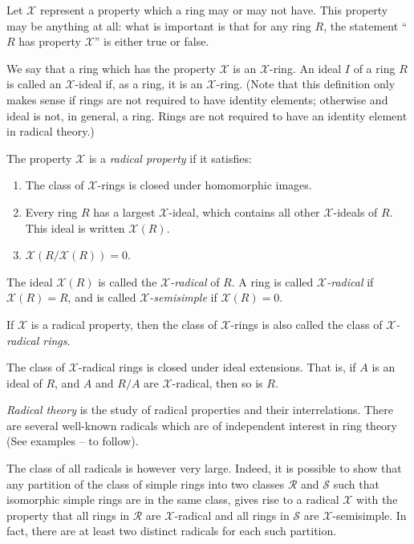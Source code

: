 \documentclass[12pt]{article}
\newcommand{\xrad}{\mathcal{X}}
\begin{document}

Let $\xrad$ represent a property which a ring may or may not have.  This property may be anything at all: what is important is that for any ring $R$, the statement ``$R$ has property $\xrad$'' is either true or false.

We say that a ring which has the property $\xrad$ is an $\xrad$-ring.  An ideal $I$ of a ring $R$ is called an $\xrad$-ideal if, as a ring, it is an $\xrad$-ring.  (Note that this definition only makes sense if rings are not required to have identity elements; otherwise and ideal is not, in general, a ring.  Rings are not required to have an identity element in radical theory.)

The property $\xrad$ is a \emph{radical property} if it satisfies:
\begin{enumerate}
\item The class of $\xrad$-rings is closed under homomorphic images.
\item Every ring $R$ has a largest $\xrad$-ideal, which contains all other $\xrad$-ideals of $R$.  This ideal is written $\xrad(R)$.
\item $\xrad(R/\xrad(R)) = 0$.
\end{enumerate}

The ideal $\xrad(R)$ is called the \emph{$\xrad$-radical} of $R$.  A ring is called \emph{$\xrad$-radical} if $\xrad(R) = R$, and is called \emph{$\xrad$-semisimple} if $\xrad(R) = 0$.

If $\xrad$ is a radical property, then the class of $\xrad$-rings is also called the class of \emph{$\xrad$-radical rings}.

The class of $\xrad$-radical rings is closed under ideal extensions.  That is, if $A$ is an ideal of $R$, and $A$ and $R/A$ are $\xrad$-radical, then so is $R$.

\emph{Radical theory} is the study of radical properties and their interrelations.  There are several well-known radicals which are of independent interest in ring theory (See examples -- to follow).

The class of all radicals is however very large.  Indeed, it is possible to show that any partition of the class of simple rings into two classes $\mathcal{R}$ and $\mathcal{S}$ such that isomorphic simple rings are in the same class,  gives rise to a radical $\xrad$ with the property that all rings in $\mathcal{R}$ are $\xrad$-radical and all rings in $\mathcal{S}$ are $\xrad$-semisimple.  In fact, there are at least two distinct radicals for each such partition.
\end{document}
